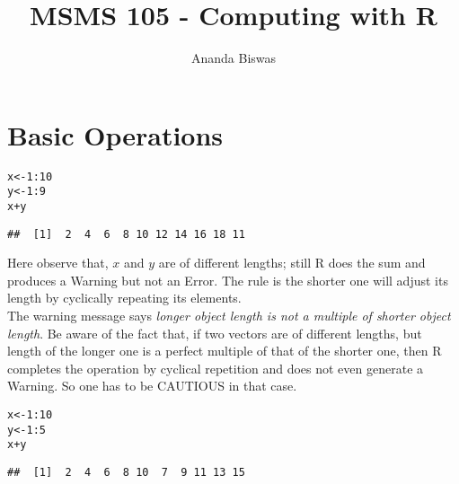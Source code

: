 \documentclass[11pt, a4paper]{article}\usepackage[]{graphicx}\usepackage[]{xcolor}
\title{\textbf{MSMS 105 - Computing with R}}
\author{Ananda Biswas}
\date{}
\makeatletter
\newcommand{\hlnum}[1]{\textcolor[rgb]{0.686,0.059,0.569}{#1}}%
\newcommand{\hlopt}[1]{\textcolor[rgb]{0,0,0}{#1}}%
\newcommand{\hldef}[1]{\textcolor[rgb]{0.345,0.345,0.345}{#1}}%
\newcommand{\hlkwb}[1]{\textcolor[rgb]{0.69,0.353,0.396}{#1}}%
\newenvironment{kframe}{%
 \def\at@end@of@kframe{}%
 \ifinner\ifhmode%
  \def\at@end@of@kframe{\end{minipage}}%
  \begin{minipage}{\columnwidth}%
 \fi\fi%
 \def\FrameCommand##1{\hskip\@totalleftmargin \hskip-\fboxsep
 \colorbox{shadecolor}{##1}\hskip-\fboxsep
     \hskip-\linewidth \hskip-\@totalleftmargin \hskip\columnwidth}%
 \MakeFramed {\advance\hsize-\width
   \@totalleftmargin\z@ \linewidth\hsize
   \@setminipage}}%
 {\par\unskip\endMakeFramed%
 \at@end@of@kframe}
\newenvironment{knitrout}{}{} %
\makeatother
\begin{document}
\maketitle

\tableofcontents

\newpage



\section{Basic Operations}
\begin{knitrout}
\color{fgcolor}\begin{kframe}
\begin{alltt}
\hldef{x} \hlkwb{<-} \hlnum{1}\hlopt{:}\hlnum{10}
\hldef{y} \hlkwb{<-} \hlnum{1}\hlopt{:}\hlnum{9}
\hldef{x} \hlopt{+} \hldef{y}
\end{alltt}


{\ttfamily\noindent\color{warningcolor}{\#\# Warning in x + y: longer object length is not a multiple of shorter object length}}\begin{verbatim}
##  [1]  2  4  6  8 10 12 14 16 18 11
\end{verbatim}
\end{kframe}
\end{knitrout}

Here observe that, $x$ and $y$ are of different lengths; still R does the sum and produces a Warning but not an Error. The rule is the shorter one will adjust its length by cyclically repeating its elements. \\

\hspace{1cm}The warning message says \textit{longer object length is not a multiple of shorter object length}. Be aware of the fact that, if two vectors are of different lengths, but length of the longer one is a perfect multiple of that of the shorter one, then R completes the operation by cyclical repetition and does not even generate a Warning. So one has to be CAUTIOUS in that case.
\begin{knitrout}
\color{fgcolor}\begin{kframe}
\begin{alltt}
\hldef{x} \hlkwb{<-} \hlnum{1}\hlopt{:}\hlnum{10}
\hldef{y} \hlkwb{<-} \hlnum{1}\hlopt{:}\hlnum{5}
\hldef{x} \hlopt{+} \hldef{y}
\end{alltt}
\begin{verbatim}
##  [1]  2  4  6  8 10  7  9 11 13 15
\end{verbatim}
\end{kframe}
\end{knitrout}
\end{document}
